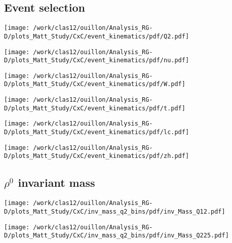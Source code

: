 \documentclass{report}
\begin{document}
    \subsection{Event selection}
    \begin{minipage}{.5\textwidth}
        \centering
        \texttt{[image: /work/clas12/ouillon/Analysis\_RG-D/plots\_Matt\_Study/CxC/event\_kinematics/pdf/Q2.pdf]}
    \end{minipage}
    \begin{minipage}{.5\textwidth}
        \centering
        \texttt{[image: /work/clas12/ouillon/Analysis\_RG-D/plots\_Matt\_Study/CxC/event\_kinematics/pdf/nu.pdf]}
    \end{minipage}

    \begin{minipage}{.5\textwidth}
        \centering
        \texttt{[image: /work/clas12/ouillon/Analysis\_RG-D/plots\_Matt\_Study/CxC/event\_kinematics/pdf/W.pdf]}
    \end{minipage}
    \begin{minipage}{.5\textwidth}
        \centering
        \texttt{[image: /work/clas12/ouillon/Analysis\_RG-D/plots\_Matt\_Study/CxC/event\_kinematics/pdf/t.pdf]}
    \end{minipage}

    \begin{minipage}{.5\textwidth}
        \centering
        \texttt{[image: /work/clas12/ouillon/Analysis\_RG-D/plots\_Matt\_Study/CxC/event\_kinematics/pdf/lc.pdf]}
    \end{minipage}
    \begin{minipage}{.5\textwidth}
        \centering
        \texttt{[image: /work/clas12/ouillon/Analysis\_RG-D/plots\_Matt\_Study/CxC/event\_kinematics/pdf/zh.pdf]}
    \end{minipage}

    \subsection{\(\rho^0\) invariant mass}
    \begin{minipage}{.5\textwidth}
        \centering
        \texttt{[image: /work/clas12/ouillon/Analysis\_RG-D/plots\_Matt\_Study/CxC/inv\_mass\_q2\_bins/pdf/inv\_Mass\_Q12.pdf]}
    \end{minipage}
    \begin{minipage}{.5\textwidth}
        \centering
        \texttt{[image: /work/clas12/ouillon/Analysis\_RG-D/plots\_Matt\_Study/CxC/inv\_mass\_q2\_bins/pdf/inv\_Mass\_Q225.pdf]}
    \end{minipage}
\end{document}

